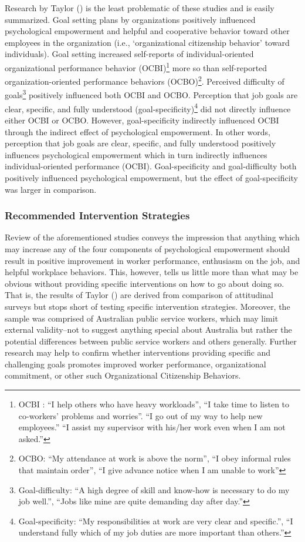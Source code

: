 \documentclass[
  11pt,
  a4paper,
]{article}
\begin{document}
Research by Taylor () is the least
problematic of these studies and is easily summarized. Goal setting
plans by organizations positively influenced psychological empowerment
and helpful and cooperative behavior toward other employees in the
organization (i.e., `organizational citizenship behavior' toward
individuals). Goal setting increased self-reports of individual-oriented
organizational performance behavior (OCBI)\footnote{OCBI : ``I help
  others who have heavy workloads'', ``I take time to listen to
  co-workers' problems and worries''. ``I go out of my way to help new
  employees.'' ``I assist my supervisor with his/her work even when I am
  not asked.''} more so than self-reported organization-oriented
performance behaviors (OCBO)\footnote{OCBO: ``My attendance at work is
  above the norm'', ``I obey informal rules that maintain order'', ``I
  give advance notice when I am unable to work''}. Perceived difficulty
of goals\footnote{Goal-difficulty: ``A high degree of skill and know-how
  is necessary to do my job well.'', ``Jobs like mine are quite
  demanding day after day.''} positively influenced both OCBI and OCBO.
Perception that job goals are clear, specific, and fully understood
(goal-specificity)\footnote{Goal-specificity: ``My responsibilities at
  work are very clear and specific.'', ``I understand fully which of my
  job duties are more important than others.''} did not directly
influence either OCBI or OCBO. However, goal-specificity indirectly
influenced OCBI through the indirect effect of psychological
empowerment. In other words, perception that job goals are clear,
specific, and fully understood positively influences psychological
empowerment which in turn indirectly influences individual-oriented
performance (OCBI). Goal-specificity and goal-difficulty both positively
influenced psychological empowerment, but the effect of goal-specificity
was larger in comparison.

\subsubsection{Recommended Intervention
Strategies}\label{recommended-intervention-strategies}

Review of the aforementioned studies conveys the impression that
anything which may increase any of the four components of psychological
empowerment should result in positive improvement in worker performance,
enthusiasm on the job, and helpful workplace behaviors. This, however,
tells us little more than what may be obvious without providing specific
interventions on how to go about doing so. That is, the results of
Taylor () are derived from comparison of
attitudinal surveys but stops short of testing specific intervention
strategies. Moreover, the sample was comprised of Australian public
service workers, which may limit external validity--not to suggest
anything special about Australia but rather the potential differences
between public service workers and others generally. Further research
may help to confirm whether interventions providing specific and
challenging goals promotes improved worker performance, organizational
commitment, or other such Organizational Citizenship Behaviors.
\end{document}
